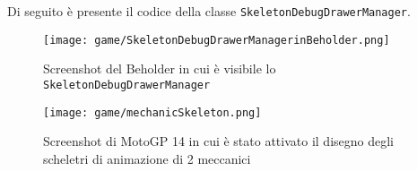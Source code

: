 	Di seguito è presente il codice della classe \texttt{SkeletonDebugDrawerManager}.
	
	\begin{figure}[h!] 
		\centering 
		\hspace*{-0.05\columnwidth}\texttt{[image: game/SkeletonDebugDrawerManagerinBeholder.png]} 
		\caption{Screenshot del Beholder in cui è visibile lo \texttt{SkeletonDebugDrawerManager}}
	\end{figure}
	
	\begin{figure}[b!] 
		\centering
		\hspace*{-0.05\columnwidth}\texttt{[image: game/mechanicSkeleton.png]} 
		\caption{Screenshot di MotoGP 14 in cui è stato attivato il disegno degli scheletri di animazione di 2 meccanici}
	\end{figure}
	
	
	
	